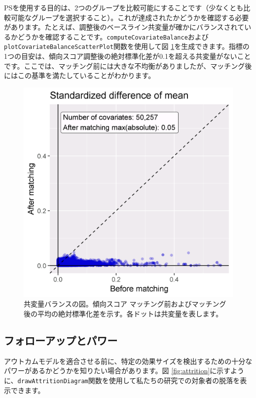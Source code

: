 \documentclass[
  11pt]{book}
\theoremstyle{definition}
\theoremstyle{definition}
\theoremstyle{definition}
\theoremstyle{definition}
\theoremstyle{remark}
\begin{document}
PSを使用する目的は、2つのグループを比較可能にすることです（少なくとも比較可能なグループを選択すること）。これが達成されたかどうかを確認する必要があります。たとえば、調整後のベースライン共変量が確かにバランスされているかどうかを確認することです。\texttt{computeCovariateBalance}および\texttt{plotCovariateBalanceScatterPlot}関数を使用して図 \ref{fig:balance}を生成できます。指標の1つの目安は、傾向スコア調整後の絶対標準化差が0.1を超える共変量がないことです。ここでは、マッチング前には大きな不均衡がありましたが、マッチング後にはこの基準を満たしていることがわかります。 

\begin{figure}

{\centering \includegraphics[width=0.7\linewidth]{images/PopulationLevelEstimation/balance} 

}

\caption{共変量バランスの図。傾向スコア マッチング前およびマッチング後の平均の絶対標準化差を示す。各ドットは共変量を表します。}\label{fig:balance}
\end{figure}

\subsection{フォローアップとパワー}\label{ux30d5ux30a9ux30edux30fcux30a2ux30c3ux30d7ux3068ux30d1ux30efux30fc}

アウトカムモデルを適合させる前に、特定の効果サイズを検出するための十分なパワーがあるかどうかを知りたい場合があります。図 \ref{fig:attrition}に示すように、\texttt{drawAttritionDiagram}関数を使用して私たちの研究での対象者の脱落を表示できます。 
\end{document}
